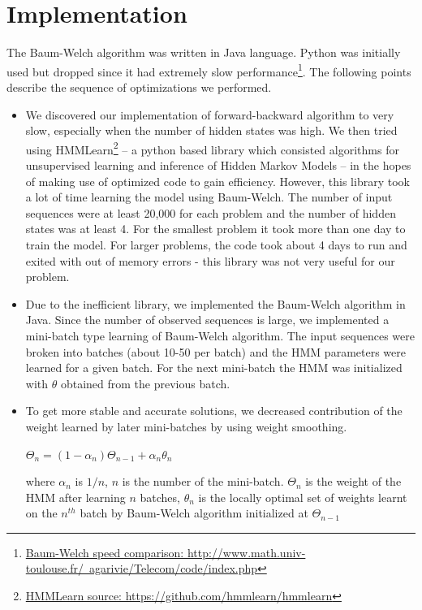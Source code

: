 \documentclass[letterpaper]{article}
\begin{document}
\section{Implementation}
The Baum-Welch algorithm was written in Java language. Python was initially used but dropped since it had extremely slow performance\footnote{\href{http://www.math.univ-toulouse.fr/~agarivie/Telecom/code/index.php}{Baum-Welch speed comparison: http://www.math.univ-toulouse.fr/~agarivie/Telecom/code/index.php}}. The following points describe the sequence of optimizations we performed.

\begin{itemize}	      	      
	\item We discovered our implementation of forward-backward algorithm to very slow, especially when the number of hidden states was high. We then tried using HMMLearn\footnote{\href{https://github.com/hmmlearn/hmmlearn}{HMMLearn source: https://github.com/hmmlearn/hmmlearn}} -- a python based library which consisted algorithms for unsupervised learning and inference of Hidden Markov Models -- in the hopes of making use of optimized code to gain efficiency. However, this library took a lot of time learning the model using Baum-Welch. The number of input sequences were at least 20,000 for each problem and the number of hidden states was at least 4. For the smallest problem it took more than one day to train the model. For larger problems, the code took about 4 days to run and exited with out of memory errors - this library was not very useful for our problem.
	      	      	      	      	      
	\item Due to the inefficient library, we implemented the Baum-Welch algorithm in Java. Since the number of observed sequences is large, we implemented a mini-batch type learning of Baum-Welch algorithm. The input sequences were broken into batches (about 10-50 per batch) and the HMM parameters were learned for a given batch. For the next mini-batch the HMM was initialized with $\theta$ obtained from the previous batch.
	      	      	      	      	      
	\item To get more stable and accurate solutions, we decreased contribution of the weight learned by later mini-batches by using weight smoothing.	      	      	      	      
	      \begin{center}
	      	$\Theta_{n} = (1-\alpha_{n})\Theta_{n-1} + \alpha_{n} \theta_{n}$
	      \end{center}     	      	      
	      where $\alpha_{n}$ is $1/n$, $n$ is the number of the mini-batch. $\Theta_{n}$ is the weight of the HMM after learning $n$ batches, $\theta_{n}$ is the locally optimal set of weights learnt on the $n^{th}$ batch by Baum-Welch algorithm initialized at $\Theta_{n-1}$ 
	      	      	      	      	      	      	      	      	      

\end{itemize}
\end{document}
